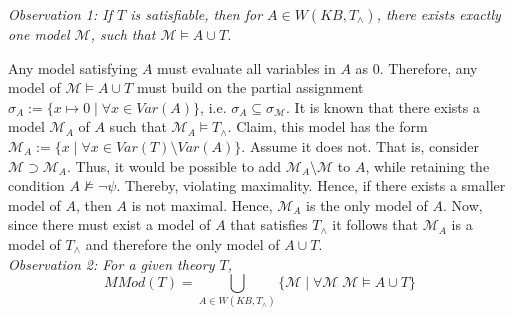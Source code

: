 \documentclass[11pt,a4paper]{article}
\newcommand{\nmodels}{\not\models}
\begin{document}
\begin{enumerate}
\begin{itemize}
\emph{Observation 1: If $T$ is satisfiable, then for $A \in W (\mathit{KB}, T_{\land})$, there exists exactly one model $\mathcal{M}$, such that $\mathcal{M} \models A \cup T$. \\}


Any model satisfying $A$ must evaluate all variables in $A$ as $0$. Therefore, any model of $\mathcal{M} \models A \cup T$ must build on the partial assignment  $\sigma_A := \{ x \mapsto 0 \mid \forall x \in \mathit{Var}(A)  \} $, i.e. $\sigma_A \subseteq \sigma_{\mathcal{M}}$. 
It is known that there exists a model $\mathcal{M}_A$ of $A$ such that $\mathcal{M}_A \models T_{\land}$. Claim, this model has the form $\mathcal{M}_A:=\{x \mid  \forall  x \in \mathit{Var}(T) \setminus \mathit{Var}(A)\}$. Assume it does not. That is, consider $\mathcal{M} \supset \mathcal{M}_A$. Thus, it would be possible to add $\mathcal{M}_A \setminus \mathcal{M}$ to $A$, while retaining the condition $A \nmodels \neg \psi$. Thereby, violating maximality. Hence, if there exists a smaller model of $A$, then $A$ is not maximal. Hence, $\mathcal{M}_A$ is the only model of $A$. Now, since there must exist a model of $A$ that satisfies $T_{\land}$ it follows that $\mathcal{M}_A$ is a model of $T_ {\land}$ and therefore the only model of $A \cup T$. \\

%
%
%
%

\emph{Observation 2: For a given theory $T$, 
\begin{equation*}
\mathit{MMod}(T) = \bigcup_{A \in W( \mathit{KB} , T_{\land})} \{ \mathcal{M} \mid \forall \mathcal{M} \; \mathcal{M} \models A \cup T\}
\end{equation*}}


\end{itemize}
\end{enumerate}
\end{document}
